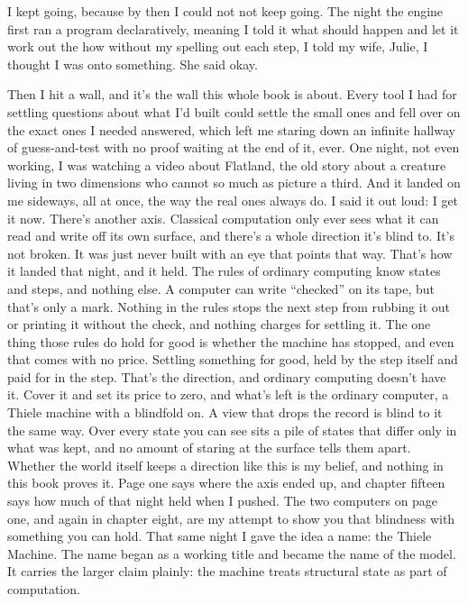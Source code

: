 \documentclass[11pt,twoside]{article}
\theoremstyle{thielethm}
\theoremstyle{thieledef}
\theoremstyle{thieledef}
\theoremstyle{thieledef}
\theoremstyle{thielethm}
\theoremstyle{thieleobs}
\theoremstyle{thielethm}
\begin{document}
I kept going, because by then I could not not keep going. The night the engine first ran a program declaratively, meaning I told it what should happen and let it work out the how without my spelling out each step, I told my wife, Julie, I thought I was onto something. She said okay.

Then I hit a wall, and it's the wall this whole book is about. Every tool I had for settling questions about what I'd built could settle the small ones and fell over on the exact ones I needed answered, which left me staring down an infinite hallway of guess-and-test with no proof waiting at the end of it, ever. One night, not even working, I was watching a video about Flatland, the old story about a creature living in two dimensions who cannot so much as picture a third. And it landed on me sideways, all at once, the way the real ones always do. I said it out loud: I get it now. There's another axis. Classical computation only ever sees what it can read and write off its own surface, and there's a whole direction it's blind to. It's not broken. It was just never built with an eye that points that way. That's how it landed that night, and it held. The rules of ordinary computing know states and steps, and nothing else. A computer can write ``checked'' on its tape, but that's only a mark. Nothing in the rules stops the next step from rubbing it out or printing it without the check, and nothing charges for settling it. The one thing those rules do hold for good is whether the machine has stopped, and even that comes with no price. Settling something for good, held by the step itself and paid for in the step. That's the direction, and ordinary computing doesn't have it. Cover it and set its price to zero, and what's left is the ordinary computer, a Thiele machine with a blindfold on. A view that drops the record is blind to it the same way. Over every state you can see sits a pile of states that differ only in what was kept, and no amount of staring at the surface tells them apart. Whether the world itself keeps a direction like this is my belief, and nothing in this book proves it. Page one says where the axis ended up, and chapter fifteen says how much of that night held when I pushed. The two computers on page one, and again in chapter eight, are my attempt to show you that blindness with something you can hold. That same night I gave the idea a name: the Thiele Machine. The name began as a working title and became the name of the model. It carries the larger claim plainly: the machine treats structural state as part of computation.
\end{document}
